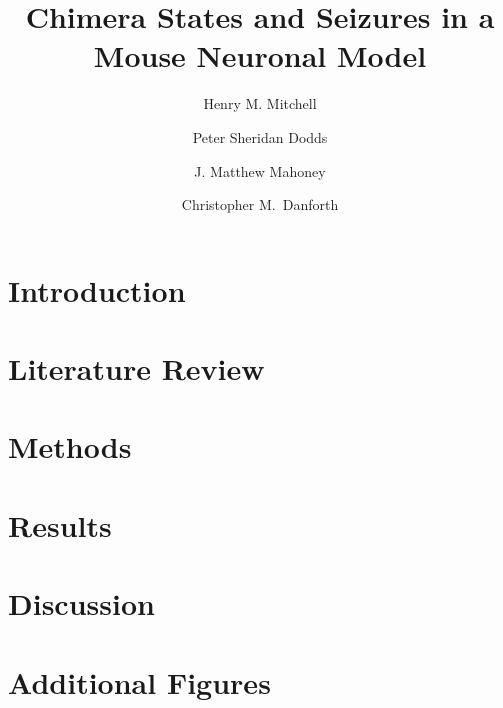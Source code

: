 \documentclass{ws-ijbc}
\begin{document}

\title{Chimera States and Seizures in a Mouse Neuronal Model}

\author{Henry M. Mitchell}
\address{Vermont Complex Systems Center, University of Vermont, \\
  82 University Place, Burlington, Vermont 05405, USA \\
  Henry.Mitchell@uvm.edu}
\author{Peter Sheridan Dodds}
\address{Vermont Complex Systems Center, University of Vermont, \\
  82 University Place, Burlington, Vermont 05405, USA}
\author{J. Matthew Mahoney}
\address{Department of Neurology, University of Vermont, \\
  95 Carrigan Drive, Burlington, Vermont 05405, USA}
\author{Christopher M.\ Danforth}
\address{Vermont Complex Systems Center, University of Vermont, \\
  82 University Place, Burlington, Vermont 05405, USA}

\maketitle

\begin{abstract}
  
\end{abstract}


\section{Introduction}
\label{sec:intro}


\section{Literature Review}
\label{sec:lit_review}


\section{Methods}
\label{sec:methods}


\section{Results}
\label{sec:results}


\section{Discussion}
\label{sec:conclusion}


\label{sec:acknowledgements}


\appendix{}

\section{Additional Figures}
\label{sec:figures}



\end{document}
